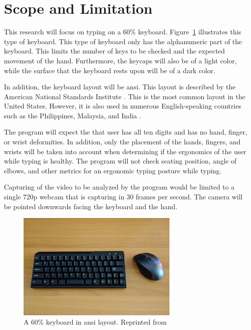 \documentclass{report}
\begin{document}
\section{Scope and Limitation}
This research will focus on typing on a 60\% keyboard. Figure~\ref{fig:60}
illustrates this type of keyboard. This type of keyboard only has the
alphanumeric part of the keyboard. This limits the number of keys to be checked
and the expected movement of the hand. Furthermore, the keycaps will also be of
a light color, while the surface that the keyboard rests upon will be of a dark
color.

In addition, the keyboard layout will be \ac{ansi}. This layout is described by
the American National Standards Institute \parencite{ansi}. This is the most
common layout in the United States. However, it is also used in numerous
English-speaking countries such as the Philippines, Malaysia, and India
\parencite{apple-layout}.


The program will expect the that user has all ten digits and has no hand,
finger, or wrist deformities. In addition, only the placement of the hands,
fingers, and wrists will be taken into account when determining if the
ergonomics of the user while typing is healthy. The program will not check
seating position, angle of elbows, and other metrics for an ergonomic typing
posture while typing.

Capturing of the video to be analyzed by the program would be limited to a
single 720p webcam that is capturing in 30 frames per second. The camera will be
pointed downwards facing the keyboard and the hand.

\begin{figure}[H]
	\centering
	\includegraphics[width=0.7\textwidth]{60.jpg}
	\caption{A 60\% keyboard in \ac{ansi} layout. Reprinted from }
	\label{fig:60}
	\centering
\end{figure}
\end{document}
